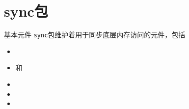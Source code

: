 \section{sync包}
  \begin{frame}{基本元件}
  \texttt{sync}包维护着用于同步底层内存访问的元件，包括
  \begin{itemize}
      \item \WaitGroup
      \item \Mutex 和 \RWMutex
      \item \Cond
      \item \Once
      \item \Pool
  \end{itemize} 
  \end{frame}